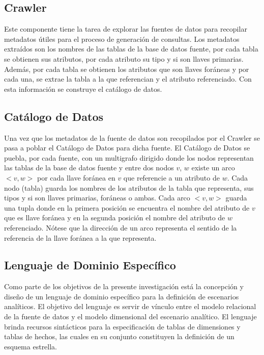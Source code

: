 \subsection{Crawler}

Este componente tiene la tarea de explorar las fuentes de datos para recopilar metadatos \'utiles para el proceso de generación
de consultas. Los metadatos extra\'idos son los nombres de las tablas de la base de datos fuente, por cada tabla se obtienen sus 
atributos, por cada atributo su tipo y si son llaves primarias. Además, por cada tabla se obtienen los atributos que son llaves 
for\'aneas y por cada una, se extrae la tabla a la que referencian y el atributo referenciado. Con esta información se construye 
el catálogo de datos.

\subsection{Catálogo de Datos}

Una vez que los metadatos de la fuente de datos son recopilados por el Crawler se pasa a poblar el Catálogo de Datos para dicha fuente. 
El Cat\'alogo de Datos se puebla, por cada fuente, 
con un multigrafo dirigido donde los nodos representan las tablas de la base de datos fuente y entre dos nodos $v$, $w$ 
existe un arco $<v,w>$ por cada llave for\'anea en $v$ que referencie a un atributo de $w$. Cada nodo (tabla) guarda 
los nombres de los atributos de la tabla que representa, sus tipos y si son llaves primarias, for\'aneas o ambas. Cada arco $<v,w>$ 
guarda una tupla donde en la primera posición se encuentra el nombre del atributo de $v$ que es llave for\'anea y en la segunda 
posición el nombre del atributo de $w$ referenciado. Nótese que la dirección de un arco representa el sentido de la 
referencia de la llave for\'anea a la que representa.

\subsection{Lenguaje de Dominio Espec\'ifico}

Como parte de los objetivos de la presente investigación est\'a la concepción y diseño de un lenguaje de dominio 
específico para la definición de escenarios analíticos. El objetivo del lenguaje es servir de vínculo 
entre el modelo relacional de la fuente de datos y el modelo dimensional del escenario analítico. El lenguaje 
brinda recursos sintácticos para la especificación de tablas de dimensiones y tablas de hechos, las cuales 
en su conjunto constituyen la definición de un esquema estrella.

